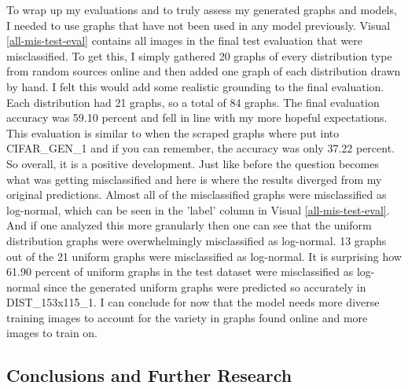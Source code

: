 \documentclass[12pt]{article}
\begin{document}
            To wrap up my evaluations and to truly assess my generated graphs and models, 
            I needed to use graphs that have not been used in any model previously. 
            Visual \ref{all-mis-test-eval} contains all images in the final test evaluation that were misclassified.
            To get this, I simply gathered 20 graphs of every distribution type from random sources online 
            and then added one graph of each distribution drawn by hand. 
            I felt this would add some realistic grounding to the final evaluation. 
            Each distribution had 21 graphs, so a total of 84 graphs. 
            The final evaluation accuracy was 59.10 percent and fell in line with my more hopeful expectations. 
            This evaluation is similar to when the scraped graphs where put into CIFAR\_GEN\_1 and if you can remember, 
            the accuracy was only 37.22 percent. So overall, it is a positive development. 
            Just like before the question becomes what was getting misclassified 
            and here is where the results diverged from my original predictions. 
            Almost all of the misclassified graphs were misclassified as log-normal,
            which can be seen in the 'label' column in Visual \ref{all-mis-test-eval}. 
            And if one analyzed this more granularly then one can see 
            that the uniform distribution graphs were overwhelmingly misclassified as log-normal. 
            13 graphs out of the 21 uniform graphs were misclassified as log-normal. 
            It is surprising how 61.90 percent of uniform graphs in the test dataset were misclassified as log-normal 
            since the generated uniform graphs were predicted so accurately in DIST\_153x115\_1.
            I can conclude for now that the model needs more diverse training images to account for the variety in graphs found online
            and more images to train on.
            

        
        \subsection{Conclusions and Further Research}
\end{document}
